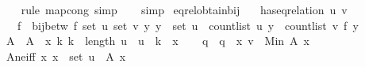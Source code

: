 \begin{isabellebody}
\ \ \isamarkupfalse%
\ {\isacharparenleft}{\kern0pt}rule\ map{\isacharunderscore}{\kern0pt}cong{\isacharcomma}{\kern0pt}\ simp{\isacharparenright}{\kern0pt}\isanewline
\ \ \isamarkupfalse%
\ simp%
\endisatagproof
{\isafoldproof}%
%
\isadelimproof
\isanewline
%
\endisadelimproof
\isanewline
{}\isamarkupfalse%
\ eq{\isacharunderscore}{\kern0pt}rel{\isacharunderscore}{\kern0pt}obtain{\isacharunderscore}{\kern0pt}bij{\isacharcolon}{\kern0pt}\isanewline
\ \ \ {\isachardoublequoteopen}has{\isacharunderscore}{\kern0pt}eq{\isacharunderscore}{\kern0pt}relation\ u\ v{\isachardoublequoteclose}\isanewline
\ \ \ f\ \ {\isachardoublequoteopen}bij{\isacharunderscore}{\kern0pt}betw\ f\ {\isacharparenleft}{\kern0pt}set\ u{\isacharparenright}{\kern0pt}\ {\isacharparenleft}{\kern0pt}set\ v{\isacharparenright}{\kern0pt}{\isachardoublequoteclose}\ {\isachardoublequoteopen}{\isasymAnd}y{\isachardot}{\kern0pt}\ y\ {\isasymin}\ set\ u\ {\isasymLongrightarrow}\ count{\isacharunderscore}{\kern0pt}list\ u\ y\ {\isacharequal}{\kern0pt}\ count{\isacharunderscore}{\kern0pt}list\ v\ {\isacharparenleft}{\kern0pt}f\ y{\isacharparenright}{\kern0pt}{\isachardoublequoteclose}\isanewline
%
\isadelimproof
%
\endisadelimproof
%
\isatagproof
{}\isamarkupfalse%
\ {\isacharminus}{\kern0pt}\isanewline
\ \ \isamarkupfalse%
\ A\ \ {\isachardoublequoteopen}A\ {\isacharequal}{\kern0pt}\ {\isacharparenleft}{\kern0pt}{\isasymlambda}x{\isachardot}{\kern0pt}\ {\isacharbraceleft}{\kern0pt}k{\isachardot}{\kern0pt}\ k\ {\isacharless}{\kern0pt}\ length\ u\ {\isasymand}\ u\ {\isacharbang}{\kern0pt}\ k\ {\isacharequal}{\kern0pt}\ x{\isacharbraceright}{\kern0pt}{\isacharparenright}{\kern0pt}{\isachardoublequoteclose}\isanewline
\ \ \isamarkupfalse%
\ q\ \ {\isachardoublequoteopen}q\ {\isacharequal}{\kern0pt}\ {\isacharparenleft}{\kern0pt}{\isasymlambda}x{\isachardot}{\kern0pt}\ v\ {\isacharbang}{\kern0pt}\ {\isacharparenleft}{\kern0pt}Min\ {\isacharparenleft}{\kern0pt}A\ x{\isacharparenright}{\kern0pt}{\isacharparenright}{\kern0pt}{\isacharparenright}{\kern0pt}{\isachardoublequoteclose}\isanewline
\isanewline
\ \ \isamarkupfalse%
\ A{\isacharunderscore}{\kern0pt}ne{\isacharunderscore}{\kern0pt}iff{\isacharcolon}{\kern0pt}\ {\isachardoublequoteopen}{\isasymAnd}x{\isachardot}{\kern0pt}\ x\ {\isasymin}\ set\ u\ {\isasymLongrightarrow}\ A\ x\ {\isasymnoteq}\ {\isacharbraceleft}{\kern0pt}{\isacharbraceright}{\kern0pt}{\isachardoublequoteclose}\ \isamarkupfalse%

\end{isabellebody}
